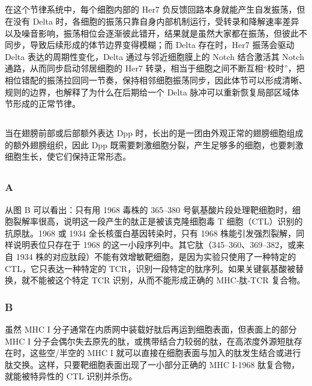 \documentclass[10pt]{article}
\begin{document}
\subsection{} %

在这个节律系统中，每个细胞内部的 Her7 负反馈回路本身就能产生自发振荡，但在没有 Delta 时，各细胞的振荡只靠自身内部机制运行，受转录和降解速率差异以及噪音影响，振荡相位会逐渐彼此错开，结果就是虽然大家都在振荡，但彼此不同步，导致后续形成的体节边界变得模糊；而 Delta 存在时，Her7 振荡会驱动 Delta 表达的周期性变化，Delta 通过与邻近细胞膜上的 Notch 结合激活其 Notch 通路，从而同步启动邻居细胞的 Her7 转录，相当于细胞之间不断互相“校时”，把相位错配的振荡拉回同一节奏，保持相邻细胞振荡同步，因此体节可以形成清晰、规则的边界，也解释了为什么在后期给一个 Delta 脉冲可以重新恢复局部区域体节形成的正常节律。

\subsection{} %

当在翅膀前部或后部额外表达 Dpp 时，长出的是一团由外观正常的翅膀细胞组成的额外翅膀组织，因此 Dpp 既需要刺激细胞分裂，产生足够多的细胞，也要刺激细胞生长，使它们保持正常形态。

\subsection{} %

\subsubsection*{A}
从图 B 可以看出：只有用 1968 毒株的 365–380 号氨基酸片段处理靶细胞时，细胞裂解率很高，说明这一段产生的肽正是被该克隆细胞毒 T 细胞（CTL）识别的抗原肽。1968 或 1934 全长核蛋白基因转染时，只有 1968 株能引发强烈裂解，同样说明表位只存在于 1968 的这一小段序列中。其它肽（345–360、369–382，或来自 1934 株的对应肽段）不能有效增敏靶细胞，是因为实验只使用了一种特定的 CTL，它只表达一种特定的 TCR，识别一段特定的肽序列。如果关键氨基酸被替换，就不能被这个特定 TCR 识别，从而不能形成正确的 MHC-肽-TCR 复合物。

\subsubsection*{B}
虽然 MHC I 分子通常在内质网中装载好肽后再运到细胞表面，但表面上的部分 MHC I 分子会偶尔失去原先的肽，或携带结合力较弱的肽，在高浓度外源短肽存在时，这些空/半空的 MHC I 就可以直接在细胞表面与加入的肽发生结合或进行肽交换。这样，只要靶细胞表面出现了一小部分正确的 MHC I-1968 肽复合物，就能被特异性的 CTL 识别并杀伤。
\end{document}
